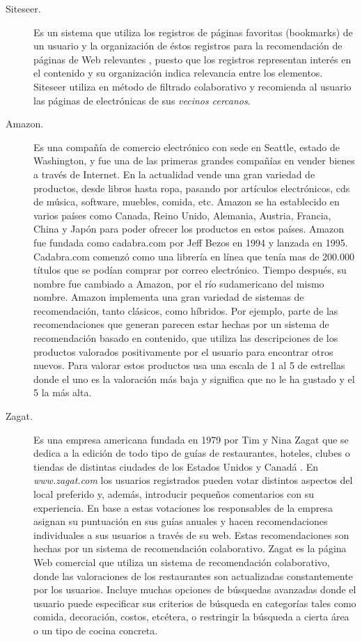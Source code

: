 \documentclass[12pt,letterpaper,oneside] {memoir}
\begin{document}
\begin{description}
\item [Siteseer.] Es un sistema que utiliza los registros de páginas favoritas (bookmarks) de un usuario y la organización de éstos registros para la recomendación de páginas de Web relevantes \citep{Rucker1997}, puesto que los registros representan interés en el contenido y su organización indica relevancia entre los elementos. Siteseer utiliza en método de filtrado colaborativo y recomienda al usuario las páginas de electrónicas de sus \textit{vecinos cercanos}.  

\item[Amazon.] Es una compañía de comercio electrónico con sede en Seattle, estado de Washington, y fue una de las primeras grandes compañías en vender bienes a través de Internet. En la actualidad vende una gran variedad de productos, desde libros hasta ropa, pasando por artículos electrónicos, cds de música, software, muebles, comida, etc. Amazon se ha establecido en varios países como Canada, Reino Unido, Alemania, Austria, Francia, China y Japón para poder ofrecer los productos en estos países.  Amazon fue fundada como cadabra.com por Jeff Bezos en 1994 y lanzada en 1995. Cadabra.com comenzó como una librería en línea que tenía mas de 200.000 títulos que se podían comprar por correo electrónico. Tiempo después, su nombre fue cambiado a Amazon, por el río sudamericano del mismo nombre. Amazon implementa una gran variedad de sistemas de recomendación, tanto clásicos, como híbridos. Por ejemplo, parte de las recomendaciones que generan parecen estar hechas por un sistema de recomendación basado en contenido, que utiliza las descripciones de los productos valorados positivamente por el usuario para encontrar otros nuevos. Para valorar estos productos usa una escala de 1 al 5 de estrellas donde el uno es la valoración más baja y significa que no le ha gustado y el 5 la más alta.

\item[Zagat.] Es una empresa americana fundada en 1979 por Tim y Nina Zagat que se dedica a la edición de todo tipo de guías de restaurantes, hoteles, clubes o tiendas de distintas ciudades de los Estados Unidos y Canadá \citep{Resnick1997}. En \textit{www.zagat.com} los usuarios registrados pueden votar distintos aspectos del local preferido y, además, introducir pequeños comentarios con su experiencia. En base a estas votaciones los responsables de la empresa asignan su puntuación en sus guías anuales y hacen recomendaciones individuales a sus usuarios a través de su web. Estas recomendaciones son hechas por un sistema de recomendación  colaborativo. Zagat es la página Web comercial que utiliza un sistema de recomendación colaborativo, donde las valoraciones de los restaurantes son actualizadas constantemente por los usuarios. Incluye muchas opciones de búsquedas avanzadas donde el usuario puede especificar sus criterios de búsqueda en categorías tales como comida, decoración, costos, etcétera, o restringir la búsqueda a cierta área o un tipo de cocina concreta.
\end{description}
\end{document}
